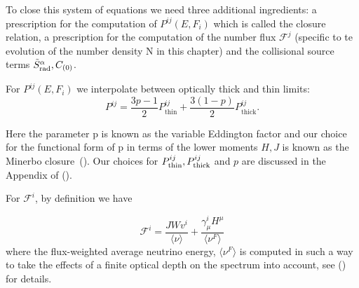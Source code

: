To close this system of equations we need three additional ingredients: a prescription for the computation of $P^{ij}(E, F_i)$ which is called the closure relation, a prescription for the computation of the number flux $\mathcal{F}^j$ (specific to te evolution of the number density N in this chapter) and the collisional source terms $\tilde{S}^\alpha_{\rm rad}, C_{(0)}$.

For $P^{ij}(E, F_i)$  we interpolate between optically thick and thin limits:
%
\begin{equation}
P^{ij} = \frac{3p-1}{2}P^{ij}_{\text{thin}} + \frac{3(1-p)}{2}P^{ij}_{\text{thick}}.
\end{equation}

Here the parameter p is known as the variable Eddington factor and our choice for the functional form of p in terms of the lower moments $H,J$ is known as the Minerbo closure~(\citet*{minerbo1978}). Our choices for $P^{ij}_{\rm thin}, P^{ij}_{\rm thick}$ and $p$ are discussed in the Appendix of (\citet*{foucartm1:2015}).

For $\mathcal{F}^i$, by definition we have

\begin{equation}
  \mathcal{F}^i = \frac{JWv^i}{\langle \nu \rangle} + \frac{\gamma^i_\mu H^\mu}{\langle \nu^F \rangle}
\end{equation}
%
where the flux-weighted average neutrino energy,  $\langle \nu^F \rangle$ is computed in such a way to take the effects of a finite optical depth on the spectrum into account, see (\citet*{foucart:2015gaa}) for details.


